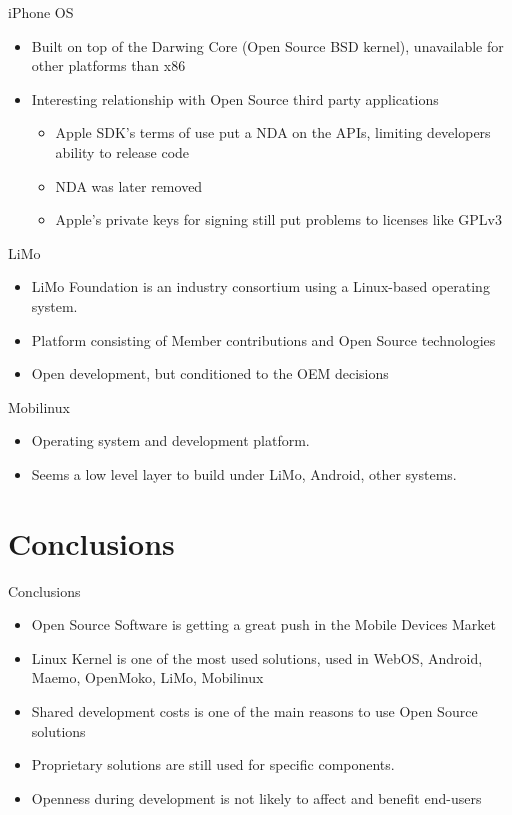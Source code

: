 \documentclass{beamer}
\begin{document}
\begin{frame}{iPhone OS}
\begin{itemize}
\item Built on top of the Darwing Core (Open Source BSD kernel), unavailable for other platforms than x86
\item Interesting relationship with Open Source third party applications
\begin{itemize}
\item Apple SDK's terms of use put a NDA on the APIs, limiting developers ability to release code
\item NDA was later removed
\item Apple's private keys for signing still put problems to licenses like GPLv3
\end{itemize}
\end{itemize}
\end{frame}

\begin{frame}{LiMo}
\begin{itemize}
\item LiMo Foundation is an industry consortium using a Linux-based operating system.
\item Platform consisting of Member contributions and Open Source technologies
\item Open development, but conditioned to the OEM decisions
\end{itemize}
\end{frame}

\begin{frame}{Mobilinux}
\begin{itemize}
\item Operating system and development platform.
\item Seems a low level layer to build under LiMo, Android, other systems.
\end{itemize}
\end{frame}

\section{Conclusions}

\begin{frame}{Conclusions}

\begin{itemize}
\item Open Source Software is getting a great push in the Mobile Devices Market
\item Linux Kernel is one of the most used solutions, used in WebOS, Android, Maemo, OpenMoko, LiMo, Mobilinux
\item Shared development costs is one of the main reasons to use Open Source solutions
\item Proprietary solutions are still used for specific components.
\item Openness during development is not likely to affect and benefit end-users
\end{itemize}

\end{frame}

\begin{frame}
	\titlepage
\end{frame}
\end{document}
